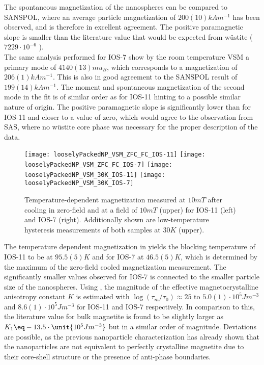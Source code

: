 \documentclass[\main/dresen_thesis.tex]{subfiles}
\begin{document}
  The spontaneous magnetization of the nanospheres can be compared to SANSPOL, where an average particle magnetization of $200(10)\unit{kA m^{-1}}$ has been observed, and is therefore in excellent agreement.
  The positive paramagnetic slope is smaller than the literature value that would be expected from w\"ustite ($7229 \cdot 10^{-6}$ \cite{Lide_2004_Handb}).
  \\

  The same analysis performed for IOS-7 show by the room temperature VSM a primary mode of $4140(13) \unit{mu_B}$, which corresponds to a magnetization of $206(1) \unit{kA m^{-1}}$.
  This is also in good agreement to the SANSPOL result of $199(14)\unit{kA m^{-1}}$.
  The moment and spontaneous magnetization of the second mode in the fit is of similar order as for IOS-11 hinting to a possible similar nature of origin.
  The positive paramagnetic slope is significantly lower than for IOS-11 and closer to a value of zero, which would agree to the observation from SAS, where no w\"ustite core phase was necessary for the proper description of the data.

  \begin{figure}[tb]
    \centering
    \texttt{[image: looselyPackedNP\_VSM\_ZFC\_FC\_IOS-11]}
    \texttt{[image: looselyPackedNP\_VSM\_ZFC\_FC\_IOS-7]}
    \texttt{[image: looselyPackedNP\_VSM\_30K\_IOS-11]}
    \texttt{[image: looselyPackedNP\_VSM\_30K\_IOS-7]}
    \caption{\label{fig:looselyPackedNP:nanoparticle:vsm10}Temperature-dependent magnetization measured at $10 \unit{mT}$ after cooling in zero-field and at a field of $10 \unit{mT}$ (upper) for IOS-11 (left) and IOS-7 (right). Additionally shown are low-temperature hysteresis measurements of both samples at $30 \unit{K}$ (upper).}
  \end{figure}
  The temperature dependent magnetization in  yields the blocking temperature of IOS-11 to be at $95.5(5) \unit{K}$ and for IOS-7 at $46.5(5) \unit{K}$, which is determined by the maximum of the zero-field cooled magnetization measurement.
  The significantly smaller values observed for IOS-7 is connected to the smaller particle size of the nanospheres.
  Using , the magnitude of the effective magnetocrystalline anisotropy constant $K$ is estimated with $\log(\tau_m / \tau_0) \approx 25$ to $5.0(1) \cdot \unit{10^{5} J m^{-3}}$ and $8.6(1)\cdot \unit{10^{5} J m^{-3}}$ for IOS-11 and IOS-7 respectively.
  In comparison to this, the literature value for bulk magnetite is found to be slightly larger as $K_1 \eq -13.5 \cdot  \unit{10^{5} J m^{-3}}$ \cite{Goya_2003_Stati} but in a similar order of magnitude.
  Deviations are possible, as the previous nanoparticle characterization has already shown that the nanoparticles are not equivalent to perfectly crystalline magnetite due to their core-shell structure or the presence of anti-phase boundaries.
\end{document}
